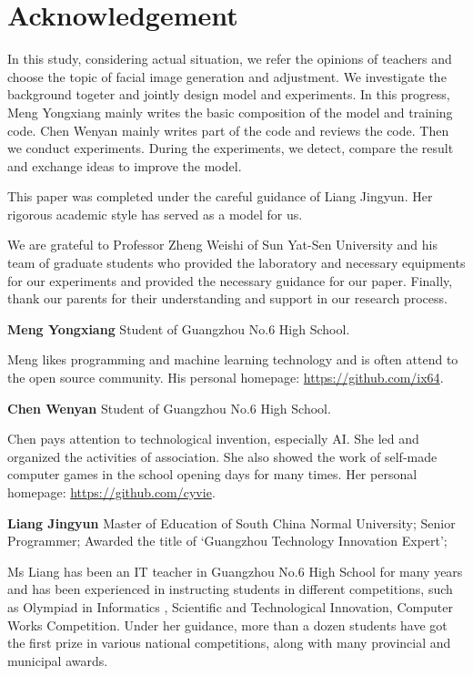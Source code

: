\section*{Acknowledgement}

In this study, considering actual situation, we refer the opinions of teachers and choose the topic of facial image generation and adjustment. We investigate the background togeter and jointly design model and experiments. In this progress, Meng Yongxiang mainly writes the basic composition of the model and training code. Chen Wenyan mainly writes part of the code and reviews the code. Then we conduct experiments. During the experiments, we detect, compare the result and exchange ideas to improve the model.

This paper was completed under the careful guidance of Liang Jingyun. Her rigorous academic style has served as a model for us.

We are grateful to Professor Zheng Weishi of Sun Yat-Sen University and his team of graduate students who provided the laboratory and necessary equipments for our experiments and provided the necessary guidance for our paper.
Finally, thank our parents for their understanding and support in our research process.

\vspace{4ex}


\textbf{Meng Yongxiang}  Student of Guangzhou No.6 High School.

Meng likes programming and machine learning technology and is often attend to the open source community. His personal homepage: \url{https://github.com/ix64}.


\textbf{Chen Wenyan}  Student of Guangzhou No.6 High School.

Chen pays attention to technological invention, especially AI. She led and organized the activities of association. She also showed the work of self-made computer games in the school opening days for many times. Her personal homepage: \url{https://github.com/cyvie}.


\textbf{Liang Jingyun}  Master of Education of South China Normal University;
Senior Programmer;
Awarded the title of ‘Guangzhou Technology Innovation Expert’;

Ms Liang has been an IT teacher in Guangzhou No.6 High School for many years and has been experienced in instructing students in different competitions, such as Olympiad in Informatics , Scientific and Technological Innovation, Computer Works Competition. Under her guidance, more than a dozen students have got the first prize in various national competitions, along with many provincial and municipal awards.



